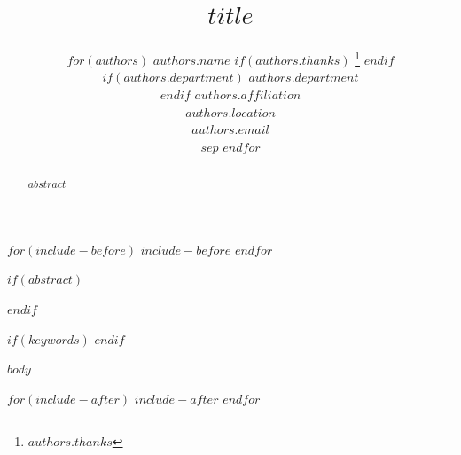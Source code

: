 \documentclass{article}
\title{$title$}
\author{
  $for(authors)$
  $authors.name$
  $if(authors.thanks)$
  \thanks{$authors.thanks$}
  $endif$ \\
  $if(authors.department)$
  $authors.department$ \\
  $endif$
  $authors.affiliation$ \\
  $authors.location$ \\
  \texttt{$authors.email$} \\
  $sep$ \And
  $endfor$
}
\begin{document}
\maketitle

$for(include-before)$
$include-before$
$endfor$

$if(abstract)$
\begin{abstract}
$abstract$
\end{abstract}
$endif$

$if(keywords)$
$endif$

$body$




$for(include-after)$
$include-after$
$endfor$
\end{document}
